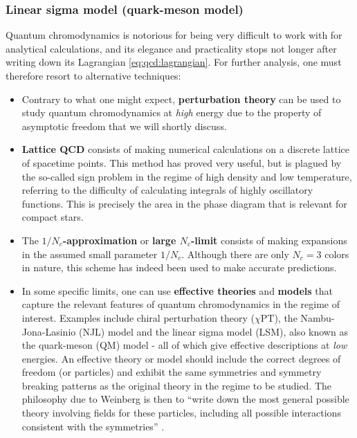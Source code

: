 \subsubsection{Linear sigma model (quark-meson model)}

Quantum chromodynamics is notorious for being very difficult to work with for analytical calculations, and its elegance and practicality stops not longer after writing down its Lagrangian \eqref{eq:qcd:lagrangian}.
For further analysis, one must therefore resort to alternative techniques:
\begin{itemize}
\item Contrary to what one might expect, \textbf{perturbation theory} can be used to study quantum chromodynamics at \emph{high} energy due to the property of asymptotic freedom that we will shortly discuss.
\item \textbf{Lattice QCD} consists of making numerical calculations on a discrete lattice of spacetime points.
      This method has proved very useful, but is plagued by the so-called sign problem in the regime of high density and low temperature, referring to the difficulty of calculating integrals of highly oscillatory functions.
      This is precisely the area in the phase diagram that is relevant for compact stars.
\item The \textbf{$1/N_c$-approximation} or \textbf{large $N_c$-limit} consists of making expansions in the assumed small parameter $1/N_c$.
      Although there are only $N_c = 3$ colors in nature, this scheme has indeed been used to make accurate predictions.
\item In some specific limits, one can use \textbf{effective theories} and \textbf{models} that capture the relevant features of quantum chromodynamics in the regime of interest.
      Examples include chiral perturbation theory ($\chi$PT), the Nambu-Jona-Lasinio (NJL) model and the linear sigma model (LSM), also known as the quark-meson (QM) model - all of which give effective descriptions at \emph{low} energies.
      An effective theory or model should include the correct degrees of freedom (or particles) and exhibit the same symmetries and symmetry breaking patterns as the original theory in the regime to be studied.
      The philosophy due to Weinberg is then to ``write down the most general possible theory involving fields for these particles, including all possible interactions consistent with the symmetries'' \cite{ref:weinberg_eft}.
\end{itemize}

